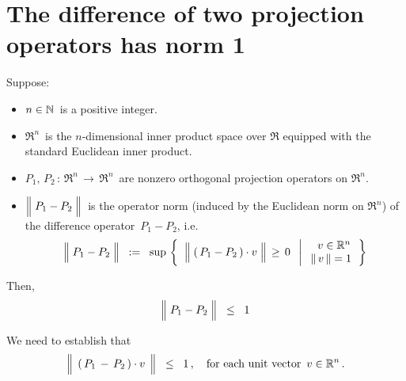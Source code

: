 

\section{The difference of two projection operators has norm 1}
\setcounter{theorem}{0}
\setcounter{equation}{0}


\renewcommand{\theenumi}{\roman{enumi}}
\renewcommand{\labelenumi}{\textnormal{(\theenumi)}$\;\;$}


\begin{proposition}
\mbox{}\vskip 0.1cm
\noindent
Suppose:
\begin{itemize}
\item
	$n \in \mathbb{N}$\, is a positive integer.
\item
	$\Re^{n}$\, is the $n$-dimensional inner product space over $\Re$ equipped with the standard Euclidean inner product.
\item
	$P_{1}, \, P_{2} \, : \, \Re^{n} \, \longrightarrow \, \Re^{n}$\,
	are nonzero orthogonal projection operators on $\Re^{n}$.
\item
	$\left\Vert\; P_{1} \overset{{\color{white}.}}{-} P_{2} \;\right\Vert$\,
	is the operator norm (induced by the Euclidean norm on $\Re^{n}$)
	of the difference operator \,$P_{1} - P_{2}$, i.e.
	\begin{equation*}
	\left\Vert\; P_{1} \overset{{\color{white}.}}{-} P_{2} \;\right\Vert
	\;\; := \;\;
		\sup\,\left\{\;\;
			\left\Vert\;(\,P_{1} \overset{{\color{white}.}}{-} P_{2}\,) \cdot v \;\right\Vert \,\geq\, 0
			\;\;\left\vert\;
			\begin{array}{c}
				{\color{white}..}v \in \Re^{n} \\ \Vert\,v\,\Vert = 1
				\end{array}
			\right.\right\}
	\end{equation*}
\end{itemize}
Then,
\begin{equation*}
\left\Vert\; P_{1} \overset{{\color{white}.}}{-} P_{2} \;\right\Vert
\;\; \leq \;\;
	1
\end{equation*}
\end{proposition}
\proof
We need to establish that
\begin{equation}\label{wantToProve}
\left\Vert\;\, (\,P_{1} \,\overset{{\color{white}.}}{-}\, P_{2}\,)\cdot v \,\;\right\Vert
\;\; \leq \;\;
	1\,,
\quad
\textnormal{for each unit vector \,$v \in \Re^{n}$}\,.
\end{equation}
